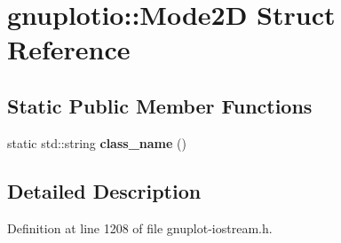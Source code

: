 \hypertarget{structgnuplotio_1_1_mode2_d}{}\section{gnuplotio\+:\+:Mode2D Struct Reference}
\label{structgnuplotio_1_1_mode2_d}
\subsection*{Static Public Member Functions}
\begin{DoxyCompactItemize}
\item 
static std\+::string {\bfseries class\+\_\+name} ()\hypertarget{structgnuplotio_1_1_mode2_d_aaf35c9cd117de8bc5dbc2d5ec1224232}{}\label{structgnuplotio_1_1_mode2_d_aaf35c9cd117de8bc5dbc2d5ec1224232}

\end{DoxyCompactItemize}


\subsection{Detailed Description}


Definition at line 1208 of file gnuplot-\/iostream.\+h.

